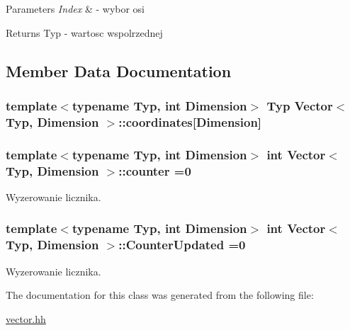 \begin{DoxyParams}{Parameters}
{\em Index} & -\/ wybor osi \\
\hline
\end{DoxyParams}
\begin{DoxyReturn}{Returns}
Typ -\/ wartosc wspolrzednej 
\end{DoxyReturn}


\subsection{Member Data Documentation}
\subsubsection[{\texorpdfstring{coordinates}{coordinates}}]{\setlength{\rightskip}{0pt plus 5cm}template$<$typename Typ, int Dimension$>$ Typ {\bf Vector}$<$ Typ, Dimension $>$\+::coordinates\mbox{[}Dimension\mbox{]}\hspace{0.3cm}{\ttfamily [private]}}\hypertarget{class_vector_a4696b907a043a0cf7feb8ef74efaee97}{}\label{class_vector_a4696b907a043a0cf7feb8ef74efaee97}
\subsubsection[{\texorpdfstring{counter}{counter}}]{\setlength{\rightskip}{0pt plus 5cm}template$<$typename Typ, int Dimension$>$ int {\bf Vector}$<$ Typ, Dimension $>$\+::counter =0\hspace{0.3cm}{\ttfamily [static]}}\hypertarget{class_vector_add70f47687018cd95d2486bd479f131a}{}\label{class_vector_add70f47687018cd95d2486bd479f131a}
Wyzerowanie licznika. 
\subsubsection[{\texorpdfstring{Counter\+Updated}{CounterUpdated}}]{\setlength{\rightskip}{0pt plus 5cm}template$<$typename Typ, int Dimension$>$ int {\bf Vector}$<$ Typ, Dimension $>$\+::Counter\+Updated =0\hspace{0.3cm}{\ttfamily [static]}}\hypertarget{class_vector_a7c6fa150970fc507368e0d06f9626194}{}\label{class_vector_a7c6fa150970fc507368e0d06f9626194}
Wyzerowanie licznika. 

The documentation for this class was generated from the following file\+:\begin{DoxyCompactItemize}
\item 
\hyperlink{vector_8hh}{vector.\+hh}\end{DoxyCompactItemize}
